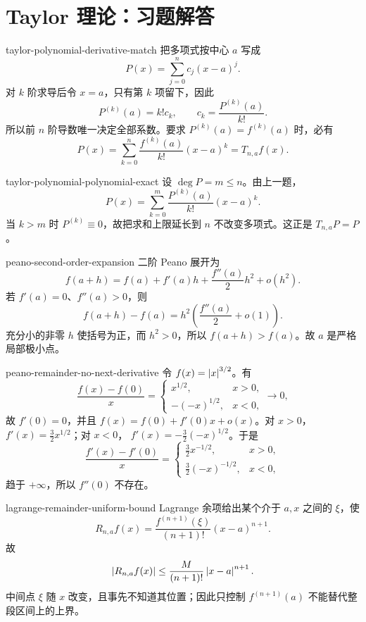 \chapter{Taylor 理论：习题解答}

\begin{solution}{taylor-polynomial-derivative-match}
把多项式按中心 \(a\) 写成
\[
 P(x)=\sum_{j=0}^{n}c_j(x-a)^j.
\]
对 \(k\) 阶求导后令 \(x=a\)，只有第 \(k\) 项留下，因此
\[
 P^{(k)}(a)=k!c_k,\qquad c_k=\frac{P^{(k)}(a)}{k!}.
\]
所以前 \(n\) 阶导数唯一决定全部系数。要求 \(P^{(k)}(a)=f^{(k)}(a)\) 时，必有
\[
 P(x)=\sum_{k=0}^{n}\frac{f^{(k)}(a)}{k!}(x-a)^k=T_{n,a}f(x).
\]
\end{solution}

\begin{solution}{taylor-polynomial-polynomial-exact}
设 \(\deg P=m\le n\)。由上一题，
\[
 P(x)=\sum_{k=0}^{m}\frac{P^{(k)}(a)}{k!}(x-a)^k.
\]
当 \(k>m\) 时 \(P^{(k)}\equiv0\)，故把求和上限延长到 \(n\) 不改变多项式。这正是 \(T_{n,a}P=P\)。
\end{solution}

\begin{solution}{peano-second-order-expansion}
二阶 Peano 展开为
\[
 f(a+h)=f(a)+f'(a)h+\frac{f''(a)}2h^2+o(h^2).
\]
若 \(f'(a)=0\)、\(f''(a)>0\)，则
\[
 f(a+h)-f(a)
 =h^2\left(\frac{f''(a)}2+o(1)\right).
\]
充分小的非零 \(h\) 使括号为正，而 \(h^2>0\)，所以 \(f(a+h)>f(a)\)。故 \(a\) 是严格局部极小点。
\end{solution}

\begin{solution}{peano-remainder-no-next-derivative}
令 \(f(x)=\left|x\right|^{3/2}\)。有
\[
 \frac{f(x)-f(0)}x=
 \begin{cases}
  x^{1/2},&x>0,\\
  -(-x)^{1/2},&x<0,
 \end{cases}
 \longrightarrow0,
\]
故 \(f'(0)=0\)，并且 \(f(x)=f(0)+f'(0)x+o(x)\)。对 \(x>0\)，
\(f'(x)=\tfrac32x^{1/2}\)；对 \(x<0\)，
\(f'(x)=-\tfrac32(-x)^{1/2}\)。于是
\[
 \frac{f'(x)-f'(0)}x=
 \begin{cases}
  \tfrac32x^{-1/2},&x>0,\\
  \tfrac32(-x)^{-1/2},&x<0,
 \end{cases}
\]
趋于 \(+\infty\)，所以 \(f''(0)\) 不存在。
\end{solution}

\begin{solution}{lagrange-remainder-uniform-bound}
Lagrange 余项给出某个介于 \(a,x\) 之间的 \(\xi\)，使
\[
 R_{n,a}f(x)=\frac{f^{(n+1)}(\xi)}{(n+1)!}(x-a)^{n+1}.
\]
故
\[
 \left|R_{n,a}f(x)\right|
 \le\frac{M}{(n+1)!}\left|x-a\right|^{n+1}.
\]
中间点 \(\xi\) 随 \(x\) 改变，且事先不知道其位置；因此只控制
\(f^{(n+1)}(a)\) 不能替代整段区间上的上界。
\end{solution}

